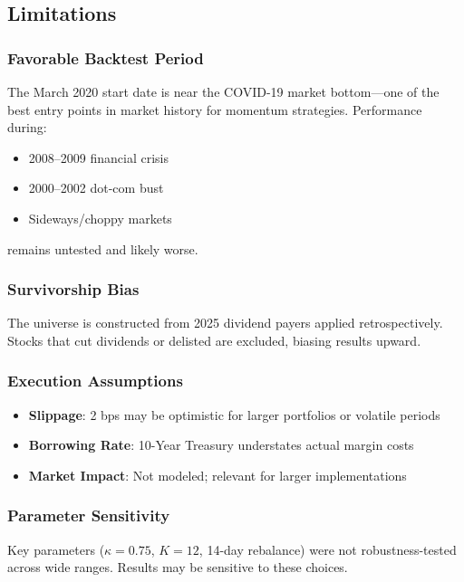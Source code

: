 \documentclass[12pt,a4paper]{article}
\theoremstyle{definition}
\begin{document}
\subsection{Limitations}

\subsubsection{Favorable Backtest Period}

The March 2020 start date is near the COVID-19 market bottom---one of the best entry points in market history for momentum strategies. Performance during:
\begin{itemize}
    \item 2008--2009 financial crisis
    \item 2000--2002 dot-com bust
    \item Sideways/choppy markets
\end{itemize}
remains untested and likely worse.

\subsubsection{Survivorship Bias}

The universe is constructed from 2025 dividend payers applied retrospectively. Stocks that cut dividends or delisted are excluded, biasing results upward.

\subsubsection{Execution Assumptions}

\begin{itemize}
    \item \textbf{Slippage}: 2 bps may be optimistic for larger portfolios or volatile periods
    \item \textbf{Borrowing Rate}: 10-Year Treasury understates actual margin costs
    \item \textbf{Market Impact}: Not modeled; relevant for larger implementations
\end{itemize}

\subsubsection{Parameter Sensitivity}

Key parameters ($\kappa = 0.75$, $K = 12$, 14-day rebalance) were not robustness-tested across wide ranges. Results may be sensitive to these choices.
\end{document}
